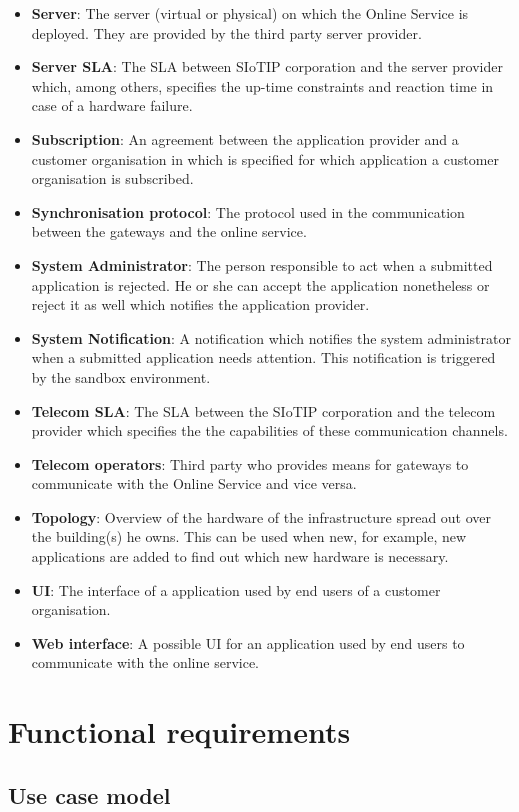 \begin{itemize}
	\item \textbf{Server}: The server (virtual or physical) on which the Online Service is deployed. They are provided by the third party server provider.
	\item \textbf{Server SLA}: The SLA between SIoTIP corporation and the server provider which, among others, specifies the up-time constraints and reaction time in case of a hardware failure.
	\item \textbf{Subscription}: An agreement between the application provider and a customer organisation in which is specified for which application a customer organisation is subscribed.
	\item \textbf{Synchronisation protocol}: The protocol used in the communication between the gateways and the online service.
	\item \textbf{System Administrator}: The person responsible to act when a submitted application is rejected. He or she can accept the application nonetheless or reject it as well which notifies the application provider.
	\item \textbf{System Notification}: A notification which notifies the system administrator when a submitted application needs attention. This notification is triggered by the sandbox environment.
	\item \textbf{Telecom SLA}: The SLA between the SIoTIP corporation and the telecom provider which specifies the the capabilities of these communication channels.
	\item \textbf{Telecom operators}: Third party who provides means for gateways to communicate with the Online Service and vice versa.
	\item \textbf{Topology}: Overview of the hardware of the infrastructure spread out over the building(s) he owns. This can be used when new, for example, new applications are added to find out which new hardware is necessary.
	\item \textbf{UI}: The interface of a application used by end users of a customer organisation.
	\item \textbf{Web interface}: A possible UI for an application used by end users to communicate with the online service.
\end{itemize}

\chapter{Functional requirements}\label{sec:functional}
\section*{Use case model}

